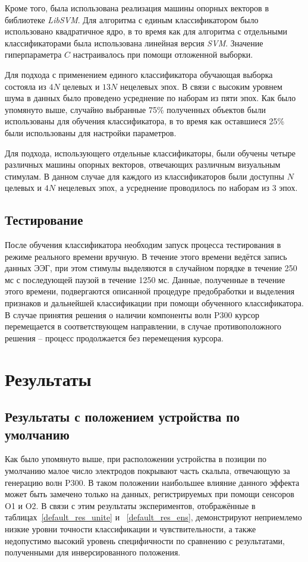 \documentclass[12pt,a4paper,oneside,fleqn,leqno]{article}
\begin{document}
	\par Кроме того, была использована реализация машины опорных векторов в библиотеке {\it LibSVM}. Для алгоритма с единым классификатором было использовано квадратичное ядро, в то время как для алгоритма с отдельными классификаторами была использована линейная версия {\it SVM}. Значение гиперпараметра $C$ настраивалось при помощи отложенной выборки.
	\par Для подхода с применением единого классификатора обучающая выборка состояла из $4N$ целевых и $13N$ нецелевых эпох. В связи с высоким уровнем шума в данных было проведено усреднение по наборам из пяти эпох. Как было упомянуто выше, случайно выбранные 75\% полученных объектов были использованы для обучения классификатора, в то время как оставшиеся 25\% были использованы для настройки параметров.
	\par Для подхода, использующего отдельные классификаторы, были обучены четыре различных машины опорных векторов, отвечающих различным визуальным стимулам. В данном случае для каждого из классификаторов были доступны $N$ целевых и $4N$ нецелевых эпох, а усреднение проводилось по наборам из 3 эпох.

\subsection{Тестирование}
	\par После обучения классификатора необходим запуск процесса тестирования в режиме реального времени вручную. В течение этого времени ведётся запись данных ЭЭГ, при этом стимулы выделяются в случайном порядке в течение 250 мс с последующей паузой в течение 1250 мс. Данные, полученные в течение этого времени, подвергаются описанной процедуре предобработки и выделения признаков и дальнейшей классификации при помощи обученного классификатора. В случае принятия решения о наличии компоненты волн P300 курсор перемещается в соответствующем направлении, в случае противоположного решения -- процесс продолжается без перемещения курсора.

\newpage

\section{Результаты}
	\subsection{Результаты с положением устройства по умолчанию}
	\par Как было упомянуто выше, при расположении устройства в позиции по умолчанию малое число электродов покрывают часть скальпа, отвечающую за генерацию волн P300. В таком положении наибольшее влияние данного эффекта может быть замечено только на данных, регистрируемых при помощи сенсоров O1 и O2. В связи с этим результаты экспериментов, отображённые в таблицах~\ref{default_res_unite} и ~\ref{default_res_ens}, демонстрируют неприемлемо низкие уровни точности классификации и чувствительности, а также недопустимо высокий уровень специфичности по сравнению с результатами, полученными для инверсированного положения.
\end{document}

